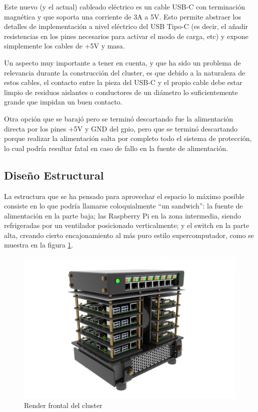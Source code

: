 Este nuevo (y el actual) cableado eléctrico es un cable USB-C con terminación magnética y que soporta una corriente de 3A a 5V. Esto permite abstraer los detalles de implementación a nivel eléctrico del USB Tipo-C (es decir, el añadir resistencias en los pines necesarios para activar el modo de carga, etc) y expone simplemente los cables de +5V y masa.

Un aspecto muy importante a tener en cuenta, y que ha sido un problema de relevancia durante la construcción del cluster, es que debido a la naturaleza de estos cables, el contacto entre la pieza del USB-C y el propio cable debe estar limpio de residuos aislantes o conductores de un diámetro lo suficientemente grande que impidan un buen contacto.

Otra opción que se barajó pero se terminó descartando fue la alimentación directa por los pines +5V y GND del \acrshort{gpio}, pero que se terminó descartando porque realizar la alimentación salta por completo todo el sistema de protección, lo cual podría resultar fatal en caso de fallo en la fuente de alimentación.



\subsection{Diseño Estructural}
\label{ssec:diseño_estructural}
La estructura que se ha pensado para aprovechar el espacio lo máximo posible consiste en lo que podría llamarse coloquialmente ``un sandwich'': la fuente de alimentación en la parte baja; las Raspberry Pi en la zona intermedia, siendo refrigeradas por un ventilador posicionado verticalmente; y el switch en la parte alta, creando cierto encajonamiento al más puro estilo supercomputador, como se muestra en la figura \ref{fig:render_cluster_1}.

\begin{figure}[h!]
  \centering
  \includegraphics[width=\textwidth]{img/cluster_render_front.jpg}
  \caption{Render frontal del cluster}
  \label{fig:render_cluster_1}
\end{figure}

